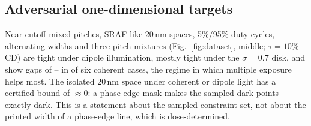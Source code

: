 \documentclass[11pt,a4paper]{article}
\newcommand{\SI}[2]{\ensuremath{#1\,\mathrm{#2}}}\newcommand{\SIrange}[3]{\ensuremath{#1\text{--}#2\,\mathrm{#3}}}
\theoremstyle{remark}\newtheorem*{remark}{Remark}
\begin{document}
\subsection{Adversarial one-dimensional targets}\label{sec:adv}
Near-cutoff mixed pitches, SRAF-like \SI{20}{nm} spaces, 5\%/95\% duty cycles, alternating widths and three-pitch mixtures (Fig.~\ref{fig:dataset}, middle; $\tau=10\%$ CD) are tight under dipole illumination, mostly tight under the $\sigma=0.7$ disk, and show gaps of \advCohGapLo--\advCohGapHi{} in \advCohBigN{} of six coherent cases, the regime in which multiple exposure helps most. The isolated \SI{20}{nm} space under coherent or dipole light has a certified bound of $\approx0$: a phase-edge mask makes the sampled dark points exactly dark. This is a statement about the sampled constraint set, not about the printed width of a phase-edge line, which is dose-determined.
\end{document}
